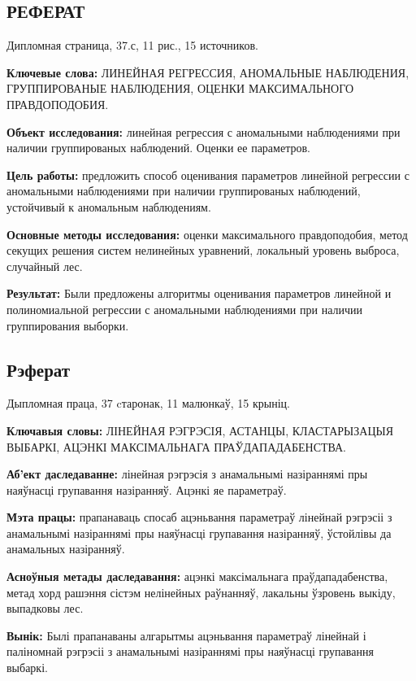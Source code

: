 \begin{center}
    \section*{РЕФЕРАТ}
\end{center}

Дипломная страница, 37.с, 11 рис., 15 источников.

\textbf{Ключевые слова:} ЛИНЕЙНАЯ РЕГРЕССИЯ, АНОМАЛЬНЫЕ НАБЛЮДЕНИЯ, ГРУППИРОВАНЫЕ НАБЛЮДЕНИЯ, ОЦЕНКИ МАКСИМАЛЬНОГО ПРАВДОПОДОБИЯ.

\textbf{Объект исследования:} линейная регрессия с аномальными наблюдениями при наличии группированых наблюдений. Оценки ее параметров.

\textbf{Цель работы:} предложить способ оценивания параметров линейной регрессии с аномальными наблюдениями при наличии группированых наблюдений, устойчивый к аномальным наблюдениям.

\textbf{Основные методы исследования:} оценки максимального правдоподобия, метод секущих решения систем нелинейных уравнений, локальный уровень выброса, случайный лес.

\textbf{Результат:} Были предложены алгоритмы оценивания параметров линейной и полиномиальной регрессии с аномальными наблюдениями при наличии группирования выборки.

\newpage

\begin{otherlanguage}{belarusian}

\begin{center}
    \section*{Рэферат}
\end{center}
Дыпломная праца, 37 cтаронак, 11 малюнкаў, 15 крыніц.

\textbf{Ключавыя словы:}  ЛІНЕЙНАЯ РЭГРЭСІЯ, АСТАНЦЫ, КЛАСТАРЫЗАЦЫЯ ВЫБАРКІ, АЦЭНКІ МАКСІМАЛЬНАГА ПРАЎДАПАДАБЕНСТВА.

\textbf{Аб'ект даследаванне:} лінейная рэгрэсія з анамальнымі назіраннямі пры наяўнасці групавання назіранняў. Ацэнкі яе параметраў.

\textbf{Мэта працы:} прапанаваць спосаб ацэньвання параметраў лінейнай рэгрэсіі з анамальнымі назіраннямі пры наяўнасці групавання назіранняў, ўстойлівы да анамальных назіранняў.

\textbf{Асноўныя метады даследавання:} ацэнкі максімальнага праўдападабенства, метад хорд рашэння сістэм нелінейных раўнанняў, лакальны ўзровень выкіду, выпадковы лес.

\textbf{Вынік:} Былі прапанаваны алгарытмы ацэньвання параметраў лінейнай і паліномнай рэгрэсіі з анамальнымі назіраннямі пры наяўнасці групавання выбаркі.

\end{otherlanguage}

